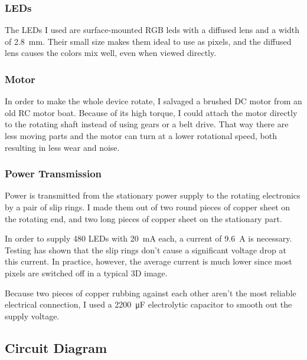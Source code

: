 \documentclass[a4paper, 11pt, titlepage]{article}
\begin{document}
\subsubsection{LEDs}

The LEDs I used are surface-mounted RGB leds with a diffused lens and a width of
\SI{2.8}{\milli\meter}. Their small size makes them ideal to use as pixels, and the diffused lens
causes the colors mix well, even when viewed directly.

\subsubsection{Motor}

In order to make the whole device rotate, I salvaged a brushed DC motor from an old RC motor boat.
Because of its high torque, I could attach the motor directly to the rotating shaft instead of
using gears or a belt drive. That way there are less moving parts and the motor can turn at a
lower rotational speed, both resulting in less wear and noise.


\subsubsection{Power Transmission}

Power is transmitted from the stationary power supply to the rotating electronics by a pair of
slip rings. I made them out of two round pieces of copper sheet on the rotating end, and two long
pieces of copper sheet on the stationary part.

In order to supply 480 LEDs with \SI{20}{\milli\ampere} each, a current of \SI{9.6}{\ampere} is
necessary. Testing has shown that the slip rings don't cause a significant voltage drop at this
current. In practice, however, the average current is much lower since most pixels are switched
off in a typical 3D image.

Because two pieces of copper rubbing against each other aren't the most reliable electrical
connection, I used a \SI{2200}{\micro\farad} electrolytic capacitor to smooth out the supply
voltage.


\subsection{Circuit Diagram}
\end{document}
